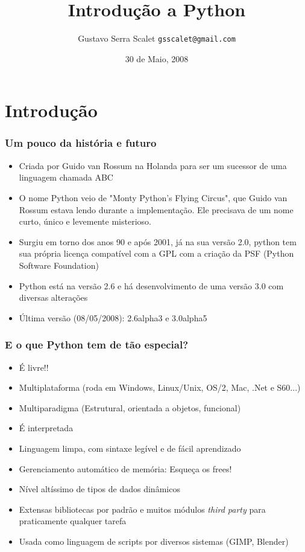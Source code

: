 \documentclass{beamer}
\author{Gustavo Serra Scalet \texttt{gsscalet@gmail.com}}
\title{Introdução a Python}
\institute{Encontros GrupySP}
\date{30 de Maio, 2008}
\begin{document}

\begin{frame}[fragile]
  \titlepage
\end{frame}

\section{Introdução}
\begin{frame}
\frametitle{Um pouco da história e futuro}
\begin{itemize}
  \item Criada por Guido van Rossum na Holanda para ser um sucessor de uma linguagem chamada ABC
  \item O nome Python veio de "Monty Python's Flying Circus", que Guido van Rossum estava lendo durante a implementação. Ele precisava de um nome curto, único e levemente misterioso.
  \item Surgiu em torno dos anos 90 e após 2001, já na sua versão 2.0, python tem sua própria licença compatível com a GPL com a criação da PSF (Python Software Foundation)
  \item Python está na versão 2.6 e há desenvolvimento de uma versão 3.0 com diversas alterações
  \item Última versão (08/05/2008): 2.6alpha3 e 3.0alpha5
\end{itemize}
\end{frame}

\begin{frame}
\frametitle{E o que Python tem de tão especial?}
\begin{itemize}
  \item É livre!!
  \item Multiplataforma (roda em Windows, Linux/Unix, OS/2, Mac, .Net e S60...)
  \item Multiparadigma (Estrutural, orientada a objetos, funcional)
  \item É interpretada
  \item Linguagem limpa, com sintaxe legível e de fácil aprendizado
  \item Gerenciamento automático de memória: Esqueça os frees!
  \item Nível altíssimo de tipos de dados dinâmicos
  \item Extensas bibliotecas por padrão e muitos módulos \textit{third party} para praticamente qualquer tarefa
  \item Usada como linguagem de scripts por diversos sistemas (GIMP, Blender)
\end{itemize}
\end{frame}
\end{document}
